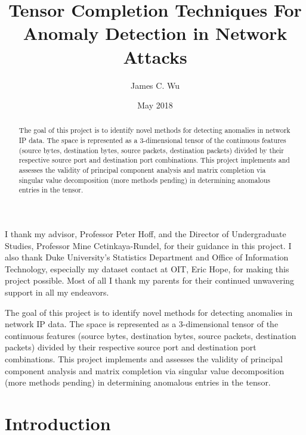 \documentclass[12pt,twoside]{dukestatscithesis}
\title{Tensor Completion Techniques For Anomaly Detection in Network Attacks}
\author{James C. Wu}
\date{May 2018}
\theoremstyle{definition}
\theoremstyle{definition}
\theoremstyle{definition}
\theoremstyle{remark}
\begin{document}
  \maketitle

\frontmatter %
\pagestyle{empty} %
  \begin{acknowledgements}
    I thank my advisor, Professor Peter Hoff, and the Director of
    Undergraduate Studies, Professor Mine Cetinkaya-Rundel, for their
    guidance in this project. I also thank Duke University's Statistics
    Department and Office of Information Technology, especially my dataset
    contact at OIT, Eric Hope, for making this project possible. Most of all
    I thank my parents for their continued unwavering support in all my
    endeavors.
  \end{acknowledgements}

  \hypersetup{linkcolor=black}
  \setcounter{tocdepth}{2}
  \tableofcontents


  \begin{abstract}
    The goal of this project is to identify novel methods for detecting
    anomalies in network IP data. The space is represented as a
    3-dimensional tensor of the continuous features (source bytes,
    destination bytes, source packets, destination packets) divided by their
    respective source port and destination port combinations. This project
    implements and assesses the validity of principal component analysis and
    matrix completion via singular value decomposition (more methods
    pending) in determining anomalous entries in the tensor.
  \end{abstract}

\mainmatter %
\pagestyle{fancyplain} %

The goal of this project is to identify novel methods for detecting
anomalies in network IP data. The space is represented as a
3-dimensional tensor of the continuous features (source bytes,
destination bytes, source packets, destination packets) divided by their
respective source port and destination port combinations. This project
implements and assesses the validity of principal component analysis and
matrix completion via singular value decomposition (more methods
pending) in determining anomalous entries in the tensor.

\chapter{Introduction}\label{introduction}
\end{document}

